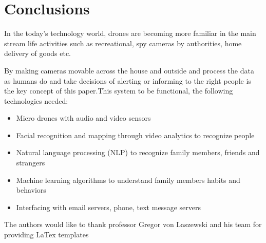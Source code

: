 \documentclass[sigconf]{acmart}
\begin{document}
\section{Conclusions}
In the today's technology world, drones are becoming more familiar in the main stream life activities such as recreational, spy cameras by authorities, home delivery of goods etc.

By making cameras movable across the house and outside and process the data as humans do and take decisions of alerting or informing to the right people is the key concept of this paper.This system to be functional, the following technologies needed:

\begin{itemize}
  
\item Micro drones with audio and video sensors

\item Facial recognition and mapping through video analytics to recognize people
	
\item Natural language processing (NLP) to recognize family members, friends and strangers

\item Machine learning algorithms to understand family members habits and behaviors

\item Interfacing with email servers, phone, text message servers

\end{itemize}

\begin{acks}
The authors would like to thank professor Gregor von Laszewski and his team for providing LaTex templates
\end{acks}


 
\end{document}
